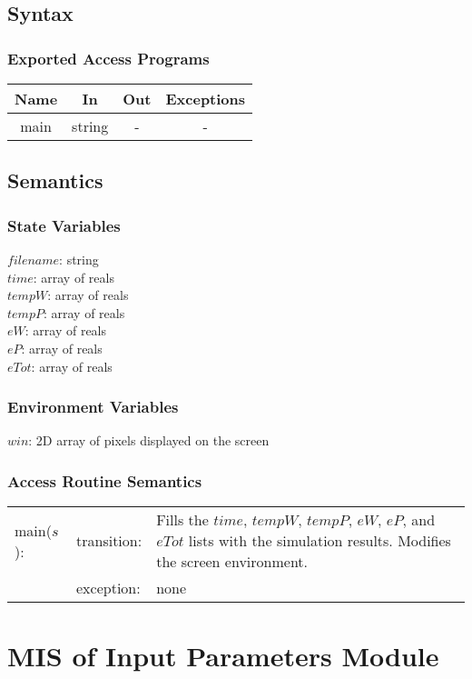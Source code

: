 \documentclass[12pt]{article}
\begin{document}
\subsection{Syntax}
\subsubsection{Exported Access Programs}
\begin{center}
\begin{tabular}{c c c c}
\hline
\textbf{Name} & \textbf{In} & \textbf{Out} & \textbf{Exceptions} \\
\hline
main & string & - & - \\
\hline
\end{tabular}
\end{center}
\subsection{Semantics}
\subsubsection{State Variables}
$filename$: string \\
$time$: array of reals \\
$tempW$: array of reals \\
$tempP$: array of reals \\
$eW$: array of reals \\
$eP$: array of reals \\ 
$eTot$: array of reals
\subsubsection{Environment Variables}
$win$: 2D array of pixels displayed on the screen
\subsubsection{Access Routine Semantics}
\begin{tabular}{l l p{12cm}}
main($s$): & transition: & Fills the $time$, $tempW$, $tempP$, $eW$, $eP$, and $eTot$ lists with the simulation results. Modifies the screen environment. \\
& exception: & none \\
\end{tabular}

\section{MIS of Input Parameters Module} \label{Parameters}
\end{document}
